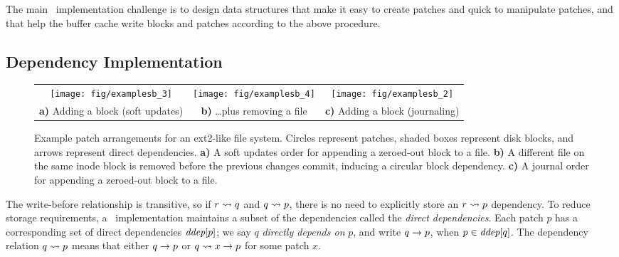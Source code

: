 The main \Featherstitch\ implementation challenge is to design
 data structures that make it easy to create patches and quick to manipulate
 patches, and that help the buffer cache write blocks and patches according
 to the above procedure.


\subsection{Dependency Implementation}



\begin{figure*}[t]
\centering
\begin{tabular}{@{}cc@{\qquad\qquad}c@{}}
\texttt{[image: fig/examplesb\_3]}
& \texttt{[image: fig/examplesb\_4]}
& \texttt{[image: fig/examplesb\_2]} \\
\textbf{a)} Adding a block (soft updates)
& \textbf{b)} \dots plus removing a file
& \textbf{c)} Adding a block (journaling) \\
\end{tabular}
\caption{Example patch arrangements for an ext2-like file system.
 Circles represent patches, shaded boxes represent disk blocks, and arrows
 represent direct dependencies.
 \textbf{a)} A soft updates order for appending a zeroed-out block to
 a file.  \textbf{b)} A different file on the same inode block is removed
 before the previous changes commit, inducing a circular block dependency.
 \textbf{c)} A journal order for appending a zeroed-out block to a
 file.}
\label{f:ex}
\end{figure*}


The write-before relationship is transitive, so if $r \leadsto q$ and $q
 \leadsto p$, there is no need to explicitly store an $r \leadsto p$
 dependency.
%
To reduce storage requirements, a \Kudos\ implementation maintains a
 subset of the dependencies called the \emph{direct dependencies}.
%
Each patch $p$ has a corresponding set of direct dependencies
 $\textit{ddep}[p]$; 
%
we say $q$ \emph{directly depends on} $p$, and write $q \rightarrow p$, when
 $p \in \textit{ddep}[q]$.
%
The dependency relation $q \leadsto p$ means that either $q
 \rightarrow p$ or $q \leadsto x \rightarrow p$ for some patch $x$.


\begin{comment}
\paragraph{Undo data}
%
When a \patch\ is created, the buffer cache's copy of the block data
is modified in-place to reflect the change. However,
%
some arrangements of \patches\ may require that the buffer cache
first write a block with only some \patches\ applied, and then write a
different block before being able to write the remaining \patches.
%
(An example of this is given in Section~\ref{sec:patch:examples}.)
\end{comment}



